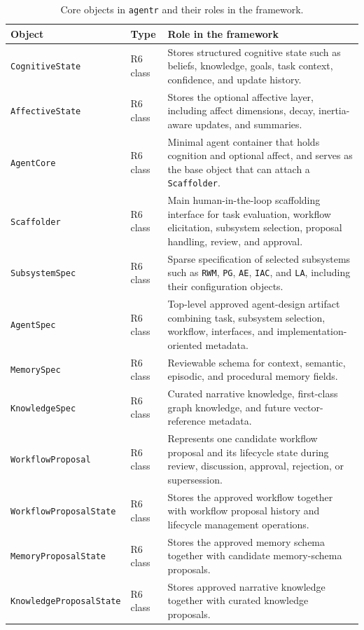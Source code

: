 \begin{table}[htbp]
\centering
\caption{Core objects in \texttt{agentr} and their roles in the framework.}
\begin{tabular}{p{3.2cm} p{2.4cm} p{8.2cm}}
\hline
\textbf{Object} & \textbf{Type} & \textbf{Role in the framework} \\
\hline
\texttt{CognitiveState} & R6 class & Stores structured cognitive state such as beliefs, knowledge, goals, task context, confidence, and update history. \\
\texttt{AffectiveState} & R6 class & Stores the optional affective layer, including affect dimensions, decay, inertia-aware updates, and summaries. \\
\texttt{AgentCore} & R6 class & Minimal agent container that holds cognition and optional affect, and serves as the base object that can attach a \texttt{Scaffolder}. \\
\texttt{Scaffolder} & R6 class & Main human-in-the-loop scaffolding interface for task evaluation, workflow elicitation, subsystem selection, proposal handling, review, and approval. \\
\texttt{SubsystemSpec} & R6 class & Sparse specification of selected subsystems such as \texttt{RWM}, \texttt{PG}, \texttt{AE}, \texttt{IAC}, and \texttt{LA}, including their configuration objects. \\
\texttt{AgentSpec} & R6 class & Top-level approved agent-design artifact combining task, subsystem selection, workflow, interfaces, and implementation-oriented metadata. \\
\texttt{MemorySpec} & R6 class & Reviewable schema for context, semantic, episodic, and procedural memory fields. \\
\texttt{KnowledgeSpec} & R6 class & Curated narrative knowledge, first-class graph knowledge, and future vector-reference metadata. \\
\texttt{WorkflowProposal} & R6 class & Represents one candidate workflow proposal and its lifecycle state during review, discussion, approval, rejection, or supersession. \\
\texttt{WorkflowProposalState} & R6 class & Stores the approved workflow together with workflow proposal history and lifecycle management operations. \\
\texttt{MemoryProposalState} & R6 class & Stores the approved memory schema together with candidate memory-schema proposals. \\
\texttt{KnowledgeProposalState} & R6 class & Stores approved narrative knowledge together with curated knowledge proposals. \\

\end{tabular}
\end{table}
